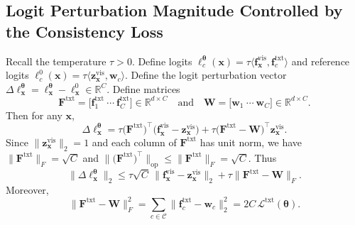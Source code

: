 \documentclass{article}
\theoremstyle{plain}
\theoremstyle{definition}
\theoremstyle{remark}
\begin{document}
	\subsection{Logit Perturbation Magnitude Controlled by the Consistency Loss}
	\label{app:logit_perturb_appendix}
	Recall the temperature $\tau>0$.
	Define logits $\ell^{\boldsymbol{\theta}}_c(\mathbf{x})=\tau\bigl\langle \mathbf{f}^{\mathrm{vis}}_{\mathbf{x}},\mathbf{f}^{\mathrm{txt}}_{c}\bigr\rangle$ and reference logits $\ell^{0}_c(\mathbf{x})=\tau\bigl\langle \mathbf{z}^{\mathrm{vis}}_{\mathbf{x}},\mathbf{w}_{c}\bigr\rangle$.
	Define the logit perturbation vector $\Delta\boldsymbol{\ell}^{\boldsymbol{\theta}}_{\mathbf{x}}=\boldsymbol{\ell}^{\boldsymbol{\theta}}_{\mathbf{x}}-\boldsymbol{\ell}^{0}_{\mathbf{x}}\in\mathbb R^{C}$.
	Define matrices
	\begin{equation*}
		\mathbf{F}^{\mathrm{txt}}=\bigl[\mathbf{f}^{\mathrm{txt}}_{1}\ \cdots\ \mathbf{f}^{\mathrm{txt}}_{C}\bigr]\in\mathbb R^{d\times C}
		\quad
		\text{and}
		\quad
		\mathbf{W}=\bigl[\mathbf{w}_{1}\ \cdots\ \mathbf{w}_{C}\bigr]\in\mathbb R^{d\times C}.
	\end{equation*}
	Then for any $\mathbf{x}$,
	\begin{equation*}
		\Delta\boldsymbol{\ell}^{\boldsymbol{\theta}}_{\mathbf{x}}
		=
		\tau \bigl(\mathbf{F}^{\mathrm{txt}}\bigr)^\top\bigl(\mathbf{f}^{\mathrm{vis}}_{\mathbf{x}}-\mathbf{z}^{\mathrm{vis}}_{\mathbf{x}}\bigr)
		+
		\tau\bigl(\mathbf{F}^{\mathrm{txt}}-\mathbf{W}\bigr)^\top \mathbf{z}^{\mathrm{vis}}_{\mathbf{x}}.
	\end{equation*}
	Since $\bigl\|\mathbf{z}^{\mathrm{vis}}_{\mathbf{x}}\bigr\|_2=1$ and each column of $\mathbf{F}^{\mathrm{txt}}$ has unit norm, we have $\|\mathbf{F}^{\mathrm{txt}}\|_F=\sqrt{C}$ and $\bigl\|\bigl(\mathbf{F}^{\mathrm{txt}}\bigr)^\top\bigr\|_{\mathrm{op}}\le\|\mathbf{F}^{\mathrm{txt}}\|_F=\sqrt{C}$.
	Thus
	\begin{equation*}
		\|\Delta\boldsymbol{\ell}^{\boldsymbol{\theta}}_{\mathbf{x}}\|_2
		\le
		\tau\sqrt{C}\,\bigl\|\mathbf{f}^{\mathrm{vis}}_{\mathbf{x}}-\mathbf{z}^{\mathrm{vis}}_{\mathbf{x}}\bigr\|_2
		+
		\tau\|\mathbf{F}^{\mathrm{txt}}-\mathbf{W}\|_F.
	\end{equation*}
	Moreover,
	\begin{equation*}
		\|\mathbf{F}^{\mathrm{txt}}-\mathbf{W}\|_F^2
		=
		\sum_{c\in \mathcal{C}}\bigl\|\mathbf{f}^{\mathrm{txt}}_{c}-\mathbf{w}_{c}\bigr\|_2^2
		=
		2C\,\mathcal L^{\mathrm{txt}}(\boldsymbol{\theta}).
	\end{equation*}
\end{document}
